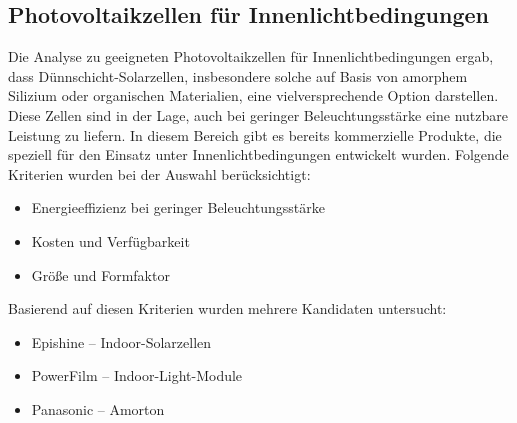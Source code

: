 \documentclass{article}
\begin{document}
\subsection{Photovoltaikzellen für Innenlichtbedingungen}
Die Analyse zu geeigneten Photovoltaikzellen für Innenlichtbedingungen ergab, dass Dünnschicht-Solarzellen, insbesondere solche auf Basis von amorphem Silizium oder 
organischen Materialien, eine vielversprechende Option darstellen. Diese Zellen sind in der Lage, auch bei geringer Beleuchtungsstärke eine nutzbare Leistung zu 
liefern. \cite{TransparentThinFilmSiliconSolarCells, D2YA00075J} In diesem Bereich gibt es bereits kommerzielle Produkte, die speziell für den Einsatz unter 
Innenlichtbedingungen entwickelt wurden. Folgende Kriterien wurden bei der Auswahl berücksichtigt:
\begin{itemize}
    \item Energieeffizienz bei geringer Beleuchtungsstärke
    \item Kosten und Verfügbarkeit
    \item Größe und Formfaktor
\end{itemize}
Basierend auf diesen Kriterien wurden mehrere Kandidaten untersucht:
\begin{itemize}
    \item Epishine – Indoor-Solarzellen \cite{EpishineIndoorSolarCells}
    \item PowerFilm – Indoor-Light-Module \cite{PowerFilmIndoorSeries}
    \item Panasonic – Amorton \cite{PanasonicAmorton}
\end{itemize}
\end{document}
